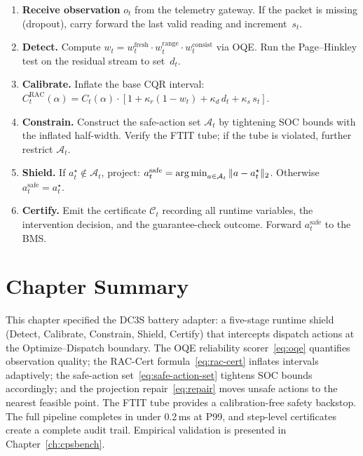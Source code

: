 \begin{enumerate}
  \item \textbf{Receive observation} $o_t$ from the telemetry gateway.
    If the packet is missing (dropout), carry forward the last valid reading
    and increment~$s_t$.

  \item \textbf{Detect.}  Compute $w_t = w_t^{\mathrm{fresh}} \cdot
    w_t^{\mathrm{range}} \cdot w_t^{\mathrm{consist}}$ via OQE.
    Run the Page--Hinkley test on the residual stream to set~$d_t$.

  \item \textbf{Calibrate.}  Inflate the base CQR interval:
    $C_t^{\mathrm{RAC}}(\alpha) = C_t(\alpha) \cdot
    [1 + \kappa_r(1-w_t) + \kappa_d\,d_t + \kappa_s\,s_t]$.

  \item \textbf{Constrain.}  Construct the safe-action set $\mathcal{A}_t$
    by tightening SOC bounds with the inflated half-width.  Verify the
    FTIT tube; if the tube is violated, further restrict $\mathcal{A}_t$.

  \item \textbf{Shield.}  If $a_t^\star \notin \mathcal{A}_t$, project:
    $a_t^{\mathrm{safe}} = \operatorname*{arg\,min}_{a \in \mathcal{A}_t} \|a - a_t^\star\|_2$.
    Otherwise $a_t^{\mathrm{safe}} = a_t^\star$.

  \item \textbf{Certify.}  Emit the certificate $\mathcal{C}_t$ recording
    all runtime variables, the intervention decision, and the
    guarantee-check outcome.  Forward $a_t^{\mathrm{safe}}$ to the BMS.
\end{enumerate}

\section{Chapter Summary}

This chapter specified the DC3S battery adapter: a five-stage runtime shield
(Detect, Calibrate, Constrain, Shield, Certify) that intercepts dispatch
actions at the Optimize--Dispatch boundary.  The OQE reliability
scorer~\eqref{eq:oqe} quantifies observation quality; the RAC-Cert
formula~\eqref{eq:rac-cert} inflates intervals adaptively; the safe-action
set~\eqref{eq:safe-action-set} tightens SOC bounds accordingly; and the
projection repair~\eqref{eq:repair} moves unsafe actions to the nearest
feasible point.  The FTIT tube provides a calibration-free safety backstop.
The full pipeline completes in under 0.2\,ms at P99, and step-level
certificates create a complete audit trail.  Empirical validation is
presented in Chapter~\ref{ch:cpsbench}.
